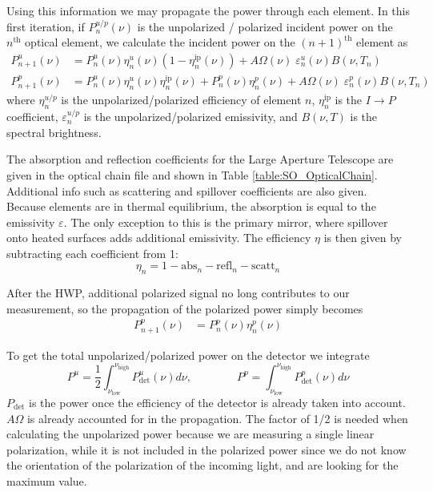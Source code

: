 \documentclass{article}
\theoremstyle{remark}
\newcommand{\tab}{\hspace*{2em}}
\renewcommand{\t}[1]{\text{#1}}
\newcommand{\ip}{$I\rightarrow P$ }
\begin{document}
\tab Using this information we may propagate the power through each element.
In this first iteration, if $P_{n}^{u/p}(\nu)$ is the unpolarized / polarized incident power on the $n^\t{th}$ optical element, 
we calculate the incident power on the $(n+1)^\t{th}$ element as
\begin{align}
P_{n+1}^u(\nu) &= P_n^u(\nu) \eta_n^u(\nu) (1 - \eta_n^{\t{ip}}(\nu)) + A\Omega(\nu) \; \varepsilon_n^u(\nu) B(\nu,T_n)\\
P_{n+1}^p(\nu) &= P_n^u(\nu) \eta_n^u(\nu) \eta_n^{\t{ip}}(\nu) +  P_n^p(\nu) \eta_n^p(\nu) + A\Omega(\nu) \; \varepsilon_n^p(\nu) B(\nu,T_n)
\end{align}
where $\eta_n^{u/p}$ is the unpolarized/polarized efficiency of element $n$, $\eta_n^\t{ip}$ is the \ip coefficient, $\varepsilon_n^{u/p}$
is the unpolarized/polarized emissivity, and $B(\nu,T)$ is the spectral brightness.

\tab The absorption and reflection coefficients for the Large Aperture Telescope are given in the optical chain file and shown in Table 
\ref{table:SO_OpticalChain}. Additional info such as scattering and spillover coefficients are also given.
Because elements are in thermal equilibrium, the absorption is equal to the emissivity $\varepsilon$.
The only exception to this is the primary mirror, where spillover onto heated surfaces adds additional emissivity.
The efficiency $\eta$ is then given by subtracting each coefficient from 1:
\[\eta_n = 1 - \t{abs}_n - \t{refl}_n - \t{scatt}_n\]

\tab After the HWP, additional polarized signal no long contributes to our measurement, 
so the propagation of the polarized power simply becomes
\begin{align}
P_{n+1}^p(\nu) &=  P_n^p(\nu) \eta_n^p(\nu) 
\end{align}


To get the total unpolarized/polarized power on the detector we integrate 
\[
P^{u} = \frac{1}{2}\int_{\nu_\t{low}}^{\nu_\t{high}} P_\t{det}^u(\nu) d\nu,
\qquad \qquad
P^{p} = \int_{\nu_\t{low}}^{\nu_\t{high}} P_\t{det}^p(\nu) d\nu
\]
$P_\t{det}$ is the power once the efficiency of the detector is already taken into account. 
$A\Omega$ is already accounted for in the propagation.
The factor of 1/2 is needed when calculating the unpolarized power because we are measuring a single linear polarization,
while it is not included in the polarized power since we do not know the orientation of the polarization of the incoming light, 
and are looking for the maximum value.
\end{document}
